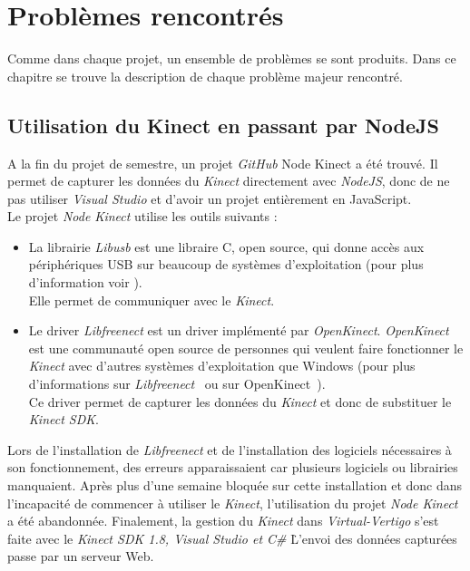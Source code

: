 \chapter{Problèmes rencontrés} \label{problemes}
Comme dans chaque projet, un ensemble de problèmes se sont produits. Dans ce chapitre se trouve la description de chaque problème majeur rencontré.

\section*{Utilisation du Kinect en passant par NodeJS}  \label{probNodeKinect}
A la fin du projet de semestre, un projet \textit{GitHub} Node Kinect \cite{NodeKinect} a été trouvé. Il permet de capturer les données du \textit{Kinect} directement avec \textit{NodeJS}, donc de ne pas utiliser \textit{Visual Studio} et d'avoir un projet entièrement en \textsf{JavaScript}. \\ 

Le projet \textit{Node Kinect} utilise les outils suivants :
\begin{itemize}
\item La librairie \textit{Libusb} est une libraire C, open source, qui donne accès aux périphériques USB sur beaucoup de systèmes d'exploitation (pour plus d'information voir \cite{libusb}).\\ 
Elle permet de communiquer avec le \textit{Kinect}. 
\item Le driver \textit{Libfreenect} est un driver implémenté par \textit{OpenKinect}. \textit{OpenKinect} est une communauté open source de personnes qui veulent faire fonctionner le \textit{Kinect} avec d'autres systèmes d'exploitation que Windows (pour plus d'informations sur \textit{Libfreenect}~\cite{libfreenect} ou sur OpenKinect~\cite{OpenKinect}).  \\
Ce driver permet de capturer les données du \textit{Kinect} et donc de substituer le \textit{Kinect SDK}. \\

\end{itemize}

Lors de l'installation de \textit{Libfreenect} et de l'installation des logiciels nécessaires à son fonctionnement, des erreurs apparaissaient car plusieurs logiciels ou librairies manquaient. Après plus d'une semaine bloquée sur cette installation et donc dans l'incapacité de commencer à utiliser le \textit{Kinect}, l'utilisation du projet \textit{Node Kinect} a été abandonnée. Finalement, la gestion du \textit{Kinect} dans \textit{Virtual-Vertigo} s'est faite avec le \textit{Kinect SDK 1.8, Visual Studio et C\#} \. L'envoi des données capturées passe par un serveur Web.

